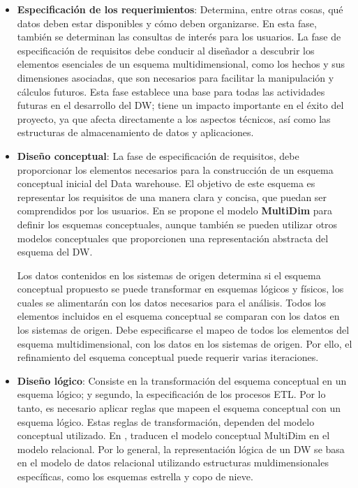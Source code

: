 \documentclass[a4paper,11pt]{article}
\begin{document}
    \begin{itemize}
      \item \textbf{Especificación de los requerimientos}:
      Determina, entre otras cosas, qué datos deben estar disponibles y cómo deben organizarse. En esta fase, también se determinan las consultas de interés
      para los usuarios. La fase de especificación de requisitos debe conducir al diseñador a descubrir los elementos esenciales de un esquema multidimensional,
      como los hechos y sus dimensiones asociadas, que son necesarios para facilitar la manipulación y cálculos futuros. Esta fase establece una base para todas
      las actividades futuras en el desarrollo del DW; tiene un impacto importante en el éxito del proyecto, ya que afecta directamente a los aspectos técnicos,
      así como las estructuras de almacenamiento de datos y aplicaciones.
      
      \item \textbf{Diseño conceptual}:
      La fase de especificación de requisitos, debe proporcionar los elementos necesarios para la construcción de un esquema conceptual inicial del Data warehouse.
      El objetivo de este esquema es representar los requisitos de una manera clara y concisa, que puedan ser comprendidos por los usuarios. 
      En \cite{VaismanZimanyi14} se propone el modelo \textbf{MultiDim} para definir los esquemas conceptuales, aunque también se pueden utilizar otros modelos
      conceptuales que proporcionen una representación abstracta del esquema del DW.

      Los datos contenidos en los sistemas de origen determina si el esquema conceptual propuesto se puede transformar en esquemas lógicos y físicos, los cuales se
      alimentarán con los datos necesarios para el análisis.
      Todos los elementos incluidos en el esquema conceptual se comparan con los datos en los sistemas de origen.
      Debe especificarse el mapeo de todos los elementos del esquema multidimensional, con los datos en los sistemas de origen. Por ello, el refinamiento del esquema
      conceptual puede requerir varias iteraciones.
      
      \item \textbf{Diseño lógico}:
      Consiste en la transformación del esquema conceptual en un esquema lógico; y segundo, la especificación de los procesos ETL.
      Por lo tanto, es necesario aplicar reglas que mapeen el esquema conceptual con un esquema lógico. Estas reglas de transformación, dependen del modelo conceptual
      utilizado. En \cite{VaismanZimanyi14}, traducen el modelo conceptual MultiDim en el modelo relacional.
      Por lo general, la representación lógica de un DW se basa en el modelo de datos relacional utilizando estructuras muldimensionales específicas, como los esquemas
      estrella y copo de nieve.
      

\end{itemize}
\end{document}
